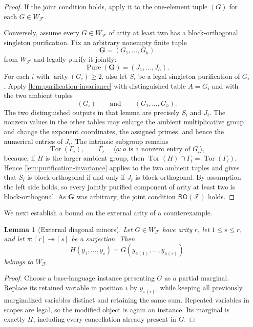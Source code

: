 \documentclass[11pt]{article}
\theoremstyle{plain}
\newtheorem{lemma}[lemma]{Lemma}
\theoremstyle{definition}
\theoremstyle{remark}
\newcommand{\cF}{\mathcal F}
\newcommand{\BO}{\mathsf{BO}}
\DeclareMathOperator{\Pure}{Pure}
\DeclareMathOperator{\arity}{arity}
\DeclareMathOperator{\Tor}{Tor}
\begin{document}
\begin{proof}
If the joint condition holds, apply it to the one-element tuple $(G)$ for
each $G\in W_{\cF}$.

Conversely, assume every $G\in W_{\cF}$ of arity at least two has a
block-orthogonal singleton purification.  Fix an arbitrary nonempty finite
tuple
\[
  \mathbf G=(G_1,\ldots,G_h)
\]
from $W_{\cF}$ and legally purify it jointly:
\[
  \Pure(\mathbf G)=(J_1,\ldots,J_h).
\]
For each $i$ with $\arity(G_i)\ge2$, also let $S_i$ be a legal singleton
purification of $G_i$.  Apply \cref{lem:purification-invariance} with
distinguished table $A=G_i$ and with the two ambient tuples
\[
  (G_i)
  \qquad\text{and}\qquad
  (G_1,\ldots,G_h).
\]
The two distinguished outputs in that lemma are precisely $S_i$ and $J_i$.
The nonzero values in the other tables may enlarge the ambient multiplicative
group and change the exponent coordinates, the assigned primes, and hence the
numerical entries of $J_i$.  The intrinsic subgroup remains
\[
  \Tor(\Gamma_i),
  \qquad
  \Gamma_i=\langle a:a\text{ is a nonzero entry of }G_i\rangle,
\]
because, if $H$ is the larger ambient group, then
$\Tor(H)\cap\Gamma_i=\Tor(\Gamma_i)$.  Hence
\cref{lem:purification-invariance} applies to the two ambient tuples and gives
that $S_i$ is block-orthogonal if and only if $J_i$ is
block-orthogonal.
By assumption the left side holds, so every jointly purified component of
arity at least two is block-orthogonal.  As $\mathbf G$ was arbitrary, the
joint condition $\BO(\cF)$ holds.
\end{proof}

We next establish a bound on the external arity of a counterexample.

\begin{lemma}[External diagonal minors]
\label{lem:diagonal-minors}
Let $G\in W_{\cF}$ have arity $r$, let $1\le s\le r$, and let
$\pi:[r]\twoheadrightarrow[s]$ be a surjection.  Then
\[
  H(y_1,\ldots,y_s)
  =G(y_{\pi(1)},\ldots,y_{\pi(r)})
\]
belongs to $W_{\cF}$.
\end{lemma}

\begin{proof}
Choose a base-language instance presenting $G$ as a partial marginal.
Replace its retained variable in position $i$ by $y_{\pi(i)}$, while keeping
all previously marginalized variables distinct and retaining the same sum.
Repeated variables in scopes are legal, so the modified object is again an
instance.  Its marginal is exactly $H$, including every cancellation already
present in $G$.
\end{proof}
\end{document}
